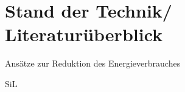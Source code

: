 \chapter{Stand der Technik/ Literaturüberblick}

Ansätze zur Reduktion des Energieverbrauches  \cite{Paryanto.2015} \cite{Pellicciari.2015} \cite{Carabin.2017}

SiL \cite[S-~56]{Eggers.2019}